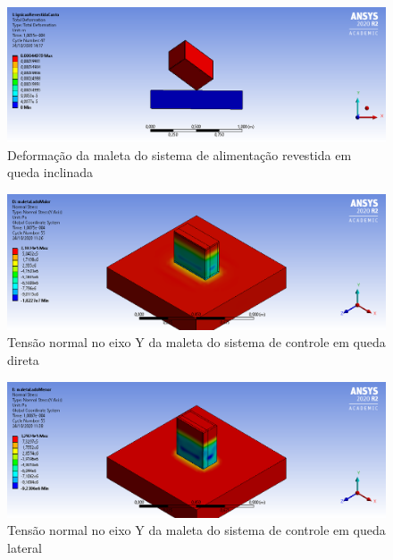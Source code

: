 \begin{apendicesenv}
\begin{figure}[htb]
    \centering
    \includegraphics[width=1.0\textwidth, angle=0]{figuras/estrutura_simulacaoImpacto/ignicaoRevestidaDeformacaoCanto.png}
    \caption{Deformação da maleta do sistema de alimentação revestida em queda inclinada}
    \label{fig:simulacaoImpacto_18}
\end{figure}

\begin{figure}[htb]
    \centering
    \includegraphics[width=1.0\textwidth, angle=0]{figuras/estrutura_simulacaoImpacto/maletaNormalYMaior.png}
    \caption{Tensão normal no eixo Y da maleta do sistema de controle em queda direta}
    \label{fig:simulacaoImpacto_19}
\end{figure}

\begin{figure}[htb]
    \centering
    \includegraphics[width=1.0\textwidth, angle=0]{figuras/estrutura_simulacaoImpacto/maletaNormalYMenor.png}
    \caption{Tensão normal no eixo Y da maleta do sistema de controle em queda lateral}
    \label{fig:simulacaoImpacto_20}
\end{figure}


\end{apendicesenv}
